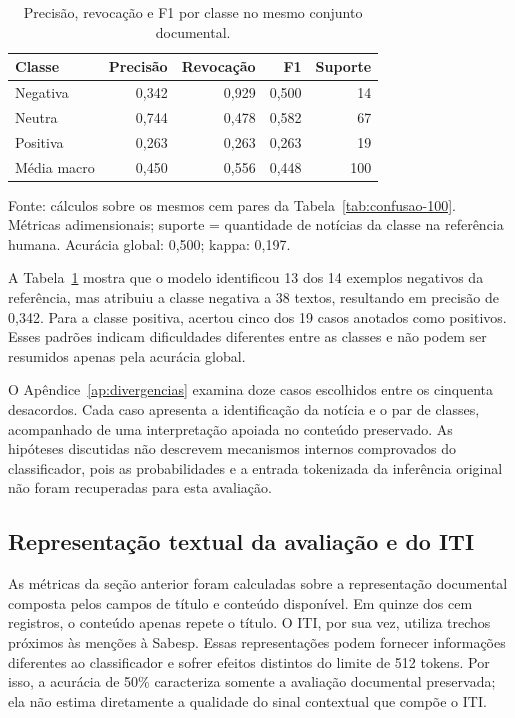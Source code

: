 \begin{table}[htbp]
\centering
\caption{Precisão, revocação e F1 por classe no mesmo conjunto documental.}
\label{tab:metricas-classe-100}
\begin{tabular}{lrrrr}
\toprule
Classe & Precisão & Revocação & F1 & Suporte \\
\midrule
Negativa & 0,342 & 0,929 & 0,500 & 14 \\
Neutra & 0,744 & 0,478 & 0,582 & 67 \\
Positiva & 0,263 & 0,263 & 0,263 & 19 \\
\midrule
Média macro & 0,450 & 0,556 & 0,448 & 100 \\
\bottomrule
\end{tabular}
\par\smallskip
{\footnotesize\raggedright Fonte: cálculos sobre os mesmos cem pares da Tabela~\ref{tab:confusao-100}. Métricas adimensionais; suporte = quantidade de notícias da classe na referência humana. Acurácia global: 0,500; kappa: 0,197.\par}
\end{table}

A Tabela~\ref{tab:metricas-classe-100} mostra que o modelo identificou 13 dos 14 exemplos negativos da referência, mas atribuiu a classe negativa a 38 textos, resultando em precisão de 0,342. Para a classe positiva, acertou cinco dos 19 casos anotados como positivos. Esses padrões indicam dificuldades diferentes entre as classes e não podem ser resumidos apenas pela acurácia global.

O Apêndice~\ref{ap:divergencias} examina doze casos escolhidos entre os cinquenta desacordos. Cada caso apresenta a identificação da notícia e o par de classes, acompanhado de uma interpretação apoiada no conteúdo preservado. As hipóteses discutidas não descrevem mecanismos internos comprovados do classificador, pois as probabilidades e a entrada tokenizada da inferência original não foram recuperadas para esta avaliação.

\subsection{Representação textual da avaliação e do ITI}

As métricas da seção anterior foram calculadas sobre a representação documental composta pelos campos de título e conteúdo disponível. Em quinze dos cem registros, o conteúdo apenas repete o título. O ITI, por sua vez, utiliza trechos próximos às menções à Sabesp. Essas representações podem fornecer informações diferentes ao classificador e sofrer efeitos distintos do limite de 512 tokens. Por isso, a acurácia de 50\% caracteriza somente a avaliação documental preservada; ela não estima diretamente a qualidade do sinal contextual que compõe o ITI.

